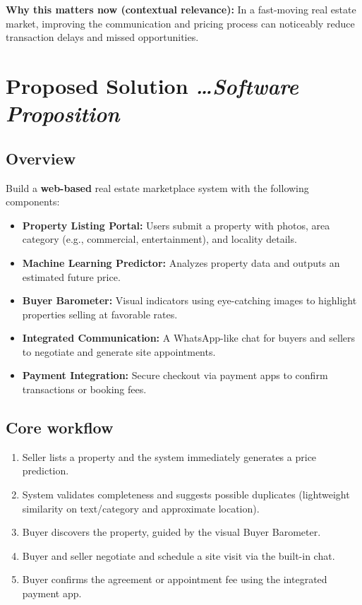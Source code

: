\documentclass[11pt,a4paper]{article}
\newcommand{\BvrHint}[1]{%
  {\normalfont\normalsize\itshape\hfill #1}}
\begin{document}
\textbf{Why this matters now (contextual relevance):} In a fast-moving real estate market, improving the communication and pricing process can noticeably reduce transaction delays and missed opportunities.

\section{Proposed Solution %
\BvrHint{\ldots Software Proposition}}
\subsection{Overview}
Build a \textbf{web-based} real estate marketplace system with the following components:
\begin{itemize}[leftmargin=0.7cm]
    \item \textbf{Property Listing Portal:} Users submit a property with photos, area category (e.g., commercial, entertainment), and locality details.
    \item \textbf{Machine Learning Predictor:} Analyzes property data and outputs an estimated future price.
    \item \textbf{Buyer Barometer:} Visual indicators using eye-catching images to highlight properties selling at favorable rates.
    \item \textbf{Integrated Communication:} A WhatsApp-like chat for buyers and sellers to negotiate and generate site appointments.
    \item \textbf{Payment Integration:} Secure checkout via payment apps to confirm transactions or booking fees.
\end{itemize}

\subsection{Core workflow}
\begin{enumerate}[leftmargin=0.7cm]
    \item Seller lists a property and the system immediately generates a price prediction.
    \item System validates completeness and suggests possible duplicates (lightweight similarity on text/category and approximate location).
    \item Buyer discovers the property, guided by the visual Buyer Barometer.
    \item Buyer and seller negotiate and schedule a site visit via the built-in chat.
    \item Buyer confirms the agreement or appointment fee using the integrated payment app.
\end{enumerate}
\end{document}
